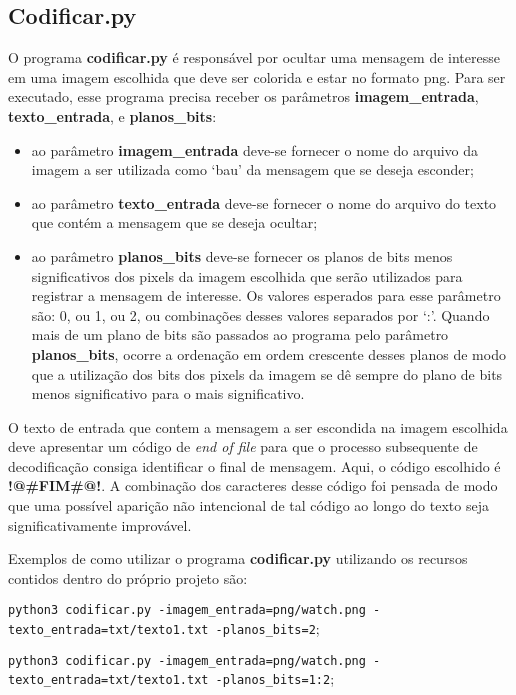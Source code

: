 \documentclass{article}
\begin{document}
\subsection{Codificar.py}
O programa \textbf{codificar.py} é responsável por ocultar uma mensagem de interesse em uma imagem escolhida que deve ser colorida e estar no formato png. Para ser executado, esse programa precisa receber os parâmetros \textbf{imagem\_entrada}, \textbf{texto\_entrada}, e \textbf{planos\_bits}:

\begin{itemize}
	\item ao parâmetro \textbf{imagem\_entrada} deve-se fornecer o nome do arquivo da imagem a ser utilizada como `bau' da mensagem que se deseja esconder;
	\item ao parâmetro \textbf{texto\_entrada} deve-se fornecer o nome do arquivo do texto que contém a mensagem que
	se deseja ocultar;
	\item ao parâmetro \textbf{planos\_bits} deve-se fornecer os planos de bits menos significativos dos pixels da imagem escolhida que serão utilizados para registrar a mensagem de interesse. Os valores esperados para esse parâmetro são: 0, ou 1, ou 2, ou combinações desses valores separados por ‘:’. Quando mais de um plano de bits são passados ao programa pelo parâmetro \textbf{planos\_bits}, ocorre a ordenação em ordem crescente desses planos de modo que a utilização dos bits dos pixels da imagem se dê sempre do plano de bits menos significativo para o mais significativo.
\end{itemize}

\noindent
O texto de entrada que contem a mensagem a ser escondida na imagem escolhida deve apresentar um código de \textit{end of file} para que o processo subsequente de decodificação consiga identificar o final de mensagem. Aqui, o código escolhido é \textbf{!@\#FIM\#@!}. A combinação dos caracteres desse código foi pensada de modo que uma possível aparição não intencional de tal código ao longo do texto seja significativamente improvável.

Exemplos de como utilizar o programa \textbf{codificar.py} utilizando os recursos contidos dentro do próprio projeto são:

\lstinline{python3 codificar.py -imagem_entrada=png/watch.png -texto_entrada=txt/texto1.txt -planos_bits=2};

\lstinline{python3 codificar.py -imagem_entrada=png/watch.png -texto_entrada=txt/texto1.txt -planos_bits=1:2};
\end{document}
